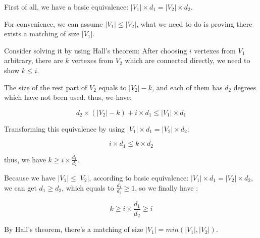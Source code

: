 First of all, we have a basic equivalence: $|V_1| \times d_1 = |V_2| \times d_2$. \par
For convenience, we can assume $|V_1| \leq |V_2|$, what we need to do is proving there exists a matching of size $|V_1|$.\par

Consider solving it by using Hall's theorem: After choosing $i$ vertexes from $V_1$ arbitrary, there are $k$ vertexes from $V_2$ which are connected directly, we need to show $k \leq i$.\par

The size of the rest part of $V_2$ equals to $|V_2| - k$, and each of them has $d_2$ degrees which have not been used.
thus, we have:

\[d_2 \times (|V_2|-k) + i \times d_1 \leq |V_1| \times d_1\]

Transforming this equivalence by using $|V_1| \times d_1 = |V_2| \times d_2$:

\[i \times d_1 \leq k \times d_2\]

thus, we have $k \geq i \times \frac{d_1}{d_2}$.

Because we have $|V_1| \leq |V_2|$, according to basic equivalence: $|V_1| \times d_1 = |V_2| \times d_2$, we can get $d_1 \geq d_2$, which equals to $\frac{d_1}{d_2} \geq 1$, so we finally have :

\[k \geq i \times \frac{d_1}{d_2} \geq i\]

By Hall's theorem, there's a matching of size $|V_1| = min(|V_1|, |V_2|)$.
